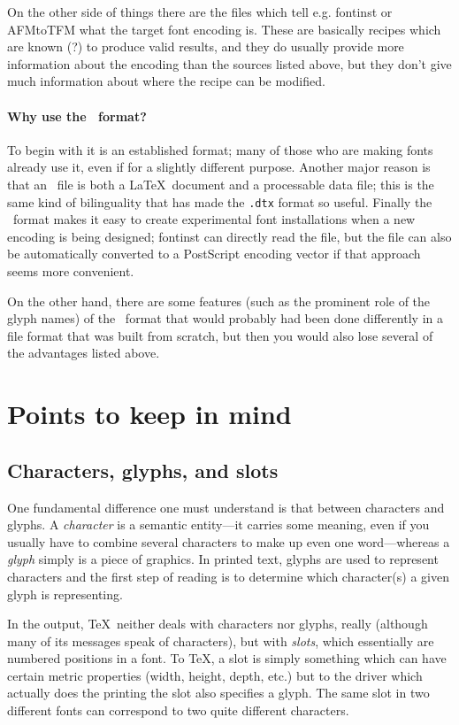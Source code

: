 \documentclass[a4paper]{article}
\DeclareRobustCommand\ETX{\textsmaller{ETX}}
\begin{document}
On the other side of things there are the files which tell e.g.
\textsf{fontinst} or \textsf{AFMtoTFM} what the target font 
encoding is. These are basically recipes which are known (?\@) to 
produce valid results, and they do usually provide more 
information about the encoding than the sources listed above, but 
they don't give much information about where the recipe can be 
modified.
    
\paragraph*{Why use the \ETX\ format?}
To begin with it is an established format; many of those 
who are making fonts already use it, even if for a slightly 
different purpose. Another major reason is that an \ETX\ file is both 
a \LaTeX\ document and a processable data file; this is the same kind 
of bilinguality that has made the \texttt{.dtx} format so useful. 
Finally the \ETX\ format makes it easy to create experimental font 
installations when a new encoding is being designed; \textsf{fontinst} 
can directly read the file, but the file can also be automatically 
converted to a PostScript encoding vector if that approach seems more 
convenient.

On the other hand, there are some features (such as the prominent 
role of the glyph names) of the \ETX\ format that would 
probably had been done differently in a file format that was built 
from scratch, but then you would also lose several of the advantages 
listed above.


\section{Points to keep in mind}

\subsection{Characters, glyphs, and slots}

One fundamental difference one must understand is that between 
characters and glyphs. A \emph{character} is a semantic entity---it 
carries some meaning, even if you usually have to combine several 
characters to make up even one word---whereas a \emph{glyph} simply 
is a piece of graphics. In printed text, glyphs are used to represent 
characters and the first step of reading is to determine which 
character(s) a given glyph is representing.

In the output, \TeX\ neither deals with characters nor glyphs, really 
(although many of its messages speak of characters), but with 
\emph{slots}, which essentially are numbered positions in a font. To 
\TeX, a slot is simply something which can have certain metric 
properties (width, height, depth, etc.\@) but to the driver which 
actually does the printing the slot also specifies a glyph. The same 
slot in two different fonts can correspond to two quite different 
characters.
\end{document}
